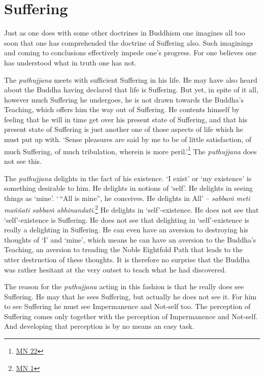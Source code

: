 \chapter{Suffering}

Just as one does with some other doctrines in Buddhism one imagines all too soon that one has comprehended the doctrine of Suffering also. Such imaginings and coming to conclusions effectively impede one's progress. For one believes one has understood what in truth one has not.

The \emph{puthujjana} meets with sufficient Suffering in his life. He may have also heard about the Buddha having declared that life is Suffering. But yet, in spite of it all, however much Suffering he undergoes, he is not drawn towards the Buddha's Teaching, which offers him the way out of Suffering. He contents himself by feeling that he will in time get over his present state of Suffering, and that his present state of Suffering is just another one of those aspects of life which he must put up with. `Sense pleasures are said by me to be of little satisfaction, of much Suffering, of much tribulation, wherein is more peril.'\footnote{\href{https://suttacentral.net/mn22/en/bodhi}{MN 22}} The \emph{puthujjana} does not see this.

The \emph{puthujjana} delights in the fact of his existence. `I exist' or `my existence' is something desirable to him. He delights in notions of `self'. He delights in seeing things as `mine'. `\,``All is mine'', he conceives. He delights in All' -- \emph{sabbaṁ meti maññati sabbaṁ abhinandati}.\footnote{\href{https://suttacentral.net/mn1/en/bodhi}{MN 1}} He delights in `self'-existence. He does not see that `self'-existence is Suffering. He does not see that delighting in `self'-existence is really a delighting in Suffering. He can even have an aversion to destroying his thoughts of `I' and `mine', which means he can have an aversion to the Buddha's Teaching, an aversion to treading the Noble Eightfold Path that leads to the utter destruction of these thoughts. It is therefore no surprise that the Buddha was rather hesitant at the very outset to teach what he had discovered.

The reason for the \emph{puthujjana} acting in this fashion is that he really does  see Suffering. He may  that he sees Suffering, but actually he does not see it. For him to see Suffering he must see Impermanence and Not-self too. The perception of Suffering comes only together with the perception of Impermanence and Not-self. And developing that perception is by no means an easy task.

